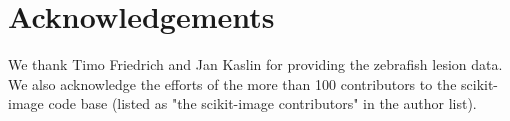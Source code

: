 
\section*{Acknowledgements}
  \label{sec:acknowledgements}

  We thank Timo Friedrich and Jan Kaslin for providing the zebrafish lesion data.
  We also acknowledge the efforts of the more than 100 contributors to the
  scikit-image code base (listed as "the scikit-image contributors" in the
  author list).
